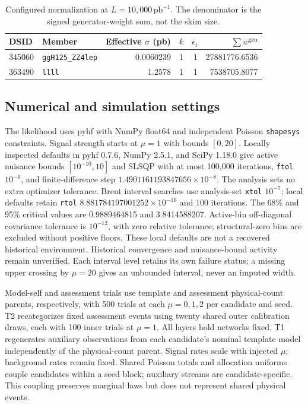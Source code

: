 \documentclass[aps,prd,reprint,superscriptaddress,nofootinbib,longbibliography,floatfix]{revtex4-2}
\let\label\OriginalLaTeXLabel
\begin{document}
\begin{table}[!htbp]
\caption{Configured normalization at $L=10{,}000\,\mathrm{pb}^{-1}$.
The denominator is the signed generator-weight sum, not the skim size.}
\label{tab:normalization}
\begin{ruledtabular}
\begin{tabular}{llrrrr}
DSID & Member & Effective $\sigma$ (pb) & $k$ & $\epsilon_{\mathrm f}$ & $\sum w^{\mathrm{gen}}$ \\
\hline
345060 & \texttt{ggH125\_ZZ4lep} & 0.0060239 & 1 & 1 & 27881776.6536 \\
363490 & \texttt{llll} & 1.2578 & 1 & 1 & 7538705.8077 \\
\end{tabular}
\end{ruledtabular}
\end{table}

\subsection{Numerical and simulation settings}

The likelihood uses pyhf with NumPy float64 and independent Poisson
\texttt{shapesys} constraints. Signal strength starts at $\mu=1$ with bounds
$[0,20]$. Locally inspected defaults in pyhf 0.7.6, NumPy 2.5.1, and SciPy
1.18.0 give active nuisance bounds $[10^{-10},10]$ and SLSQP with at most
100,000 iterations, \texttt{ftol} $10^{-6}$, and finite-difference step
$1.4901161193847656\times10^{-8}$. The analysis sets no extra optimizer
tolerance. Brent interval searches use analysis-set \texttt{xtol} $10^{-7}$;
local defaults retain \texttt{rtol} $8.881784197001252\times10^{-16}$ and
100 iterations. The 68\% and 95\% critical values are 0.9889464815 and
3.8414588207. Active-bin off-diagonal covariance tolerance is $10^{-12}$,
with zero relative tolerance; structural-zero bins are excluded without
positive floors. These local defaults are not a recovered historical
environment. Historical convergence and nuisance-bound activity remain
unverified. Each interval level retains its own failure status; a missing
upper crossing by $\mu=20$ gives an unbounded interval, never an imputed width.

Model-self and assessment trials use template and assessment physical-count
parents, respectively, with 500 trials at each $\mu=0,1,2$ per candidate and
seed. T2 recategorizes fixed assessment events using twenty shared outer
calibration draws, each with 100 inner trials at $\mu=1$. All layers hold
networks fixed. T1 regenerates auxiliary observations from each candidate's
nominal template model independently of the physical-count parent. Signal
rates scale with injected $\mu$; background rates remain fixed. Shared
Poisson totals and allocation uniforms couple candidates within a seed
block; auxiliary streams are candidate-specific. This coupling preserves
marginal laws but does not represent shared physical events.
\end{document}
